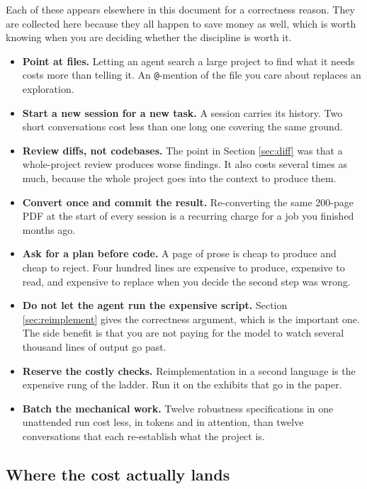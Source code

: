 \documentclass[11pt,a4paper]{article}
\newcommand{\code}[1]{\texttt{\small #1}}
\begin{document}
Each of these appears elsewhere in this document for a correctness reason. They
are collected here because they all happen to save money as well, which is worth
knowing when you are deciding whether the discipline is worth it.

\begin{itemize}
\item \textbf{Point at files.} Letting an agent search a large project to find
  what it needs costs more than telling it. An \code{@}-mention of the file you
  care about replaces an exploration.
\item \textbf{Start a new session for a new task.} A session carries its history.
  Two short conversations cost less than one long one covering the same ground.
\item \textbf{Review diffs, not codebases.} The point in Section \ref{sec:diff}
  was that a whole-project review produces worse findings. It also costs several
  times as much, because the whole project goes into the context to produce them.
\item \textbf{Convert once and commit the result.} Re-converting the same
  200-page PDF at the start of every session is a recurring charge for a job you
  finished months ago.
\item \textbf{Ask for a plan before code.} A page of prose is cheap to produce
  and cheap to reject. Four hundred lines are expensive to produce, expensive to
  read, and expensive to replace when you decide the second step was wrong.
\item \textbf{Do not let the agent run the expensive script.} Section
  \ref{sec:reimplement} gives the correctness argument, which is the important
  one. The side benefit is that you are not paying for the model to watch several
  thousand lines of output go past.
\item \textbf{Reserve the costly checks.} Reimplementation in a second language
  is the expensive rung of the ladder. Run it on the exhibits that go in the
  paper.
\item \textbf{Batch the mechanical work.} Twelve robustness specifications in one
  unattended run cost less, in tokens and in attention, than twelve
  conversations that each re-establish what the project is.
\end{itemize}

\subsection{Where the cost actually lands}
\end{document}

